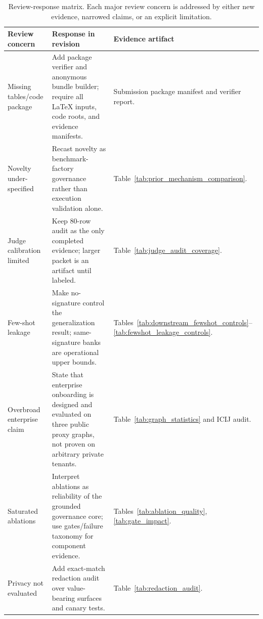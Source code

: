 \begin{table}[t]
\centering
\small
\begin{tabular}{p{}p{}p{}}
\toprule
Review concern & Response in revision & Evidence artifact \\
\midrule
Missing tables/code package & Add package verifier and anonymous bundle builder; require all LaTeX inputs, code roots, and evidence manifests. & Submission package manifest and verifier report. \\
Novelty under-specified & Recast novelty as benchmark-factory governance rather than execution validation alone. & Table~\ref{tab:prior_mechanism_comparison}. \\
Judge calibration limited & Keep 80-row audit as the only completed evidence; larger packet is an artifact until labeled. & Table~\ref{tab:judge_audit_coverage}. \\
Few-shot leakage & Make no-signature control the generalization result; same-signature banks are operational upper bounds. & Tables~\ref{tab:downstream_fewshot_controls}--\ref{tab:fewshot_leakage_controls}. \\
Overbroad enterprise claim & State that enterprise onboarding is designed and evaluated on three public proxy graphs, not proven on arbitrary private tenants. & Table~\ref{tab:graph_statistics} and ICIJ audit. \\
Saturated ablations & Interpret ablations as reliability of the grounded governance core; use gates/failure taxonomy for component evidence. & Tables~\ref{tab:ablation_quality}, \ref{tab:gate_impact}. \\
Privacy not evaluated & Add exact-match redaction audit over value-bearing surfaces and canary tests. & Table~\ref{tab:redaction_audit}. \\
\bottomrule
\end{tabular}
\caption{Review-response matrix. Each major review concern is addressed by either new evidence, narrowed claims, or an explicit limitation.}
\label{tab:review_response_matrix}
\end{table}

